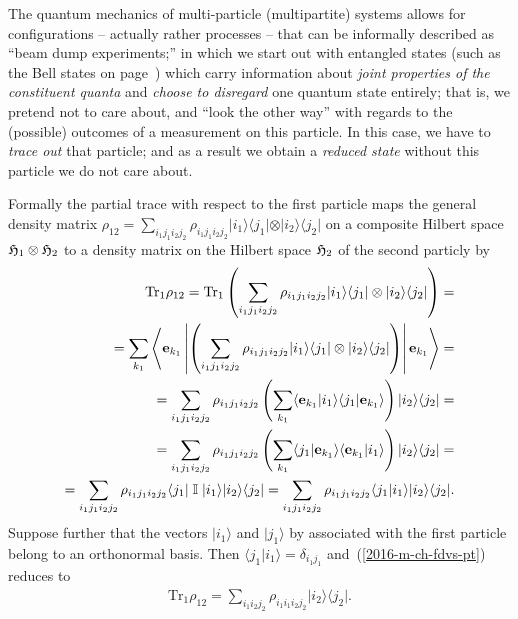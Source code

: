 The quantum mechanics of multi-particle (multipartite) systems allows for configurations -- actually rather processes --
that can be informally described as ``beam dump experiments;'' in which we start out with entangled states
(such as the Bell states on page~\pageref{2014-m-ch-fdvs-bellbasis})  which carry information
about {\em joint properties of the constituent quanta}
and {\em choose to disregard} one quantum state entirely; that is, we pretend
not to care about, and ``look the other way'' with regards to the (possible) outcomes of a measurement on this particle.
In this case, we have to {\em trace out} that particle; and as a result we obtain a {\em reduced state} without this particle we do
not care about.

Formally the partial trace with respect to the first particle
maps the general density matrix
${ \rho}_{12} = \sum_{i_1 j_1 i_2 j_2} \rho_{i_1 j_1 i_2 j_2}   \vert i_1\rangle \langle j_1\vert \otimes \vert i_2\rangle \langle j_2 \vert$
on a composite Hilbert space
$
{\frak H}_1
\otimes
{\frak H}_2
$
to  a density matrix on the Hilbert space
${\frak H}_2
$ of the second particly by
\begin{equation}
\begin{split}
\textrm{Tr}_1
{ \rho}_{12}
= \textrm{Tr}_1  \left(   \sum_{i_1 j_1 i_2 j_2} \rho_{i_1 j_1 i_2 j_2}   \vert i_1\rangle \langle j_1\vert \otimes \vert i_2 \rangle \langle j_2 \vert \right)
=\\
= \sum_{k_1}   \left\langle {\bf e}_{k_1}  \left\vert \left(   \sum_{i_1 j_1 i_2 j_2} \rho_{i_1 j_1 i_2 j_2}
 \vert i_1\rangle \langle j_1\vert \otimes \vert i_2 \rangle \langle j_2 \vert  \right)  \right\vert {\bf e}_{k_1} \right\rangle
=\\
=  \sum_{i_1 j_1 i_2 j_2} \rho_{i_1 j_1 i_2 j_2}  \left( \sum_{k_1}
 \langle {\bf e}_{k_1}  \vert i_1\rangle \langle j_1\vert    {\bf e}_{k_1}  \rangle  \right)  \vert i_2 \rangle \langle j_2 \vert
=\\
=  \sum_{i_1 j_1 i_2 j_2} \rho_{i_1 j_1 i_2 j_2}  \left( \sum_{k_1}
 \langle j_1\vert    {\bf e}_{k_1}  \rangle  \langle {\bf e}_{k_1}  \vert i_1\rangle \right)  \vert i_2 \rangle \langle j_2 \vert
=\\
=  \sum_{i_1 j_1 i_2 j_2} \rho_{i_1 j_1 i_2 j_2}
 \langle j_1\vert   \; {\Bbb I} \; \vert i_1\rangle   \vert i_2 \rangle \langle j_2 \vert
=  \sum_{i_1 j_1 i_2 j_2} \rho_{i_1 j_1 i_2 j_2}
 \langle j_1 \vert  i_1\rangle    \vert i_2 \rangle \langle j_2 \vert
.
\end{split}
\label{2016-m-ch-fdvs-pt}
\end{equation}
Suppose further that the vectors
$\vert i_1 \rangle$
and
$\vert j_1 \rangle$
by   associated with the first particle
belong to an orthonormal basis.
Then $\langle j_1 \vert  i_1\rangle =\delta_{i_1 j_1}$ and~(\ref{2016-m-ch-fdvs-pt})
reduces to
\begin{equation}
\begin{split}
\textrm{Tr}_1
{ \rho}_{12}
=  \sum_{i_1 i_2 j_2} \rho_{i_1 i_1 i_2 j_2}
  \vert i_2 \rangle \langle j_2 \vert
.
\end{split}
\label{2016-m-ch-fdvs-pt2}
\end{equation}

